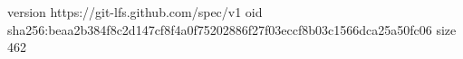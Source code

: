 version https://git-lfs.github.com/spec/v1
oid sha256:beaa2b384f8c2d147cf8f4a0f75202886f27f03eccf8b03c1566dca25a50fc06
size 462
